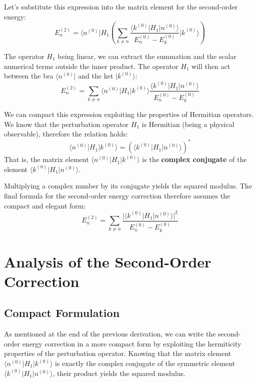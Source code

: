 Let's substitute this expression into the matrix element for the second-order energy:
\begin{equation}
E_n^{(2)} = \langle n^{(0)} | H_1 \left( \sum_{k \neq n} \frac{\langle k^{(0)} | H_1 | n^{(0)} \rangle}{E_n^{(0)} - E_k^{(0)}} |k^{(0)}\rangle \right)
\end{equation}

The operator $H_1$ being linear, we can extract the summation and the scalar numerical terms outside the inner product. The operator $H_1$ will then act between the bra $\langle n^{(0)} \vert{}$ and the ket $\vert{}k^{(0)}\rangle$:
\begin{equation}
E_n^{(2)} = \sum_{k \neq n} \langle n^{(0)} | H_1 | k^{(0)} \rangle \frac{\langle k^{(0)} | H_1 | n^{(0)} \rangle}{E_n^{(0)} - E_k^{(0)}}
\end{equation}

We can compact this expression exploiting the properties of Hermitian operators. We know that the perturbation operator $H_1$ is Hermitian (being a physical observable), therefore the relation holds:
\begin{equation}
\langle n^{(0)} | H_1 | k^{(0)} \rangle = \left( \langle k^{(0)} | H_1 | n^{(0)} \rangle \right)^*
\end{equation}
That is, the matrix element $\langle n^{(0)} \vert{} H_1 \vert{} k^{(0)} \rangle$ is the \textbf{complex conjugate} of the element $\langle k^{(0)} \vert{} H_1 \vert{} n^{(0)} \rangle$.

Multiplying a complex number by its conjugate yields the squared modulus. The final formula for the second-order energy correction therefore assumes the compact and elegant form:
\begin{equation}
E_n^{(2)} = \sum_{k \neq n} \frac{\big| \langle k^{(0)} | H_1 | n^{(0)} \rangle \big|^2}{E_n^{(0)} - E_k^{(0)}}
\end{equation}

\section{Analysis of the Second-Order Correction}

\subsection{Compact Formulation}
As mentioned at the end of the previous derivation, we can write the second-order energy correction in a more compact form by exploiting the hermiticity properties of the perturbation operator. Knowing that the matrix element $\langle n^{(0)} \vert{} H_1 \vert{} k^{(0)} \rangle$ is exactly the complex conjugate of the symmetric element $\langle k^{(0)} \vert{} H_1 \vert{} n^{(0)} \rangle$, their product yields the squared modulus.

